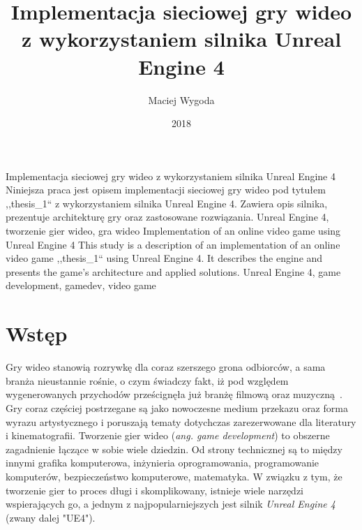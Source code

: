 \documentclass[multip]{SGGW-thesis}
\title{Implementacja sieciowej gry wideo z wykorzystaniem silnika Unreal Engine 4}
\author{Maciej Wygoda}
\date{2018}
\begin{document}
\maketitle
{}
\statementpage
\abstractpage
{Implementacja sieciowej gry wideo z wykorzystaniem silnika Unreal Engine 4}
{Niniejsza praca jest opisem implementacji sieciowej gry wideo pod tytułem ,,thesis\_1`` z wykorzystaniem silnika Unreal Engine 4. Zawiera opis silnika, prezentuje architekturę gry oraz zastosowane rozwiązania.}
{Unreal Engine 4, tworzenie gier wideo, gra wideo}
{Implementation of an online video game using Unreal Engine 4}
{This study is a description of an implementation of an online video game ,,thesis\_1`` using Unreal Engine 4. It describes the engine and presents the game's architecture and applied solutions.}
{Unreal Engine 4, game development, gamedev, video game}

\tableofcontents

\chapter{Wstęp}
Gry wideo stanowią rozrywkę dla coraz szerszego grona odbiorców, a sama branża nieustannie rośnie, o czym świadczy fakt, iż pod względem wygenerowanych przychodów prześcignęła już branżę filmową oraz muzyczną~\cite{nasdaq-video-games-industry}. Gry coraz częściej postrzegane są jako nowoczesne medium przekazu oraz forma wyrazu artystycznego i poruszają tematy dotychczas zarezerwowane dla literatury i kinematografii. 
\newline \indent Tworzenie gier wideo ({\em ang. game development}) to obszerne zagadnienie łączące w sobie wiele dziedzin. Od strony technicznej są to między innymi grafika komputerowa, inżynieria oprogramowania, programowanie komputerów, bezpieczeństwo komputerowe, matematyka\cite{perelki}. W związku z tym, że tworzenie gier to proces długi i skomplikowany, istnieje wiele narzędzi wspierających go, a jednym z najpopularniejszych jest silnik {\em Unreal Engine 4} (zwany dalej "UE4").
\end{document}
